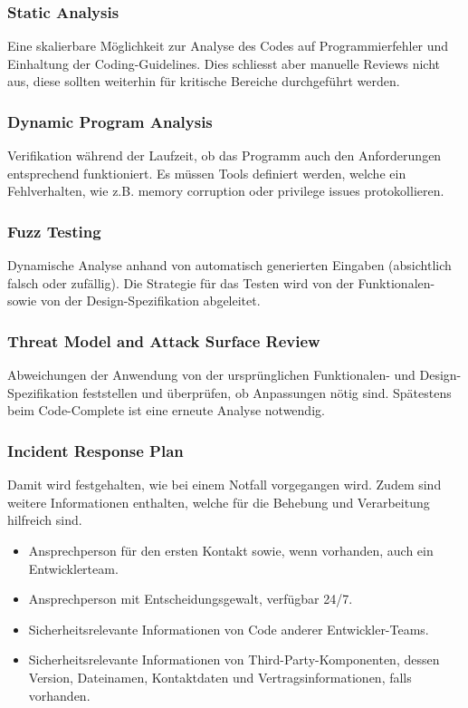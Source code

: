 \subsubsection{Static Analysis}
Eine skalierbare Möglichkeit zur Analyse des Codes auf Programmierfehler und Einhaltung der Coding-Guidelines. Dies schliesst aber manuelle Reviews nicht aus, diese sollten weiterhin für kritische Bereiche durchgeführt werden.

\subsubsection{Dynamic Program Analysis}
Verifikation während der Laufzeit, ob das Programm auch den Anforderungen entsprechend funktioniert. Es müssen Tools definiert werden, welche ein Fehlverhalten, wie z.B. memory corruption oder privilege issues protokollieren.

\subsubsection{Fuzz Testing}
Dynamische Analyse anhand von automatisch generierten Eingaben (absichtlich falsch oder zufällig). Die Strategie für das Testen wird von der Funktionalen- sowie von der Design-Spezifikation abgeleitet.

\subsubsection{Threat Model and Attack Surface Review}
Abweichungen der Anwendung von der ursprünglichen Funktionalen- und Design-Spezifikation feststellen und überprüfen, ob Anpassungen nötig sind. Spätestens beim Code-Complete ist eine erneute Analyse notwendig.

\subsubsection{Incident Response Plan}
Damit wird festgehalten, wie bei einem Notfall vorgegangen wird. Zudem sind weitere Informationen enthalten, welche für die Behebung und Verarbeitung hilfreich sind.
\begin{itemize}
	\item Ansprechperson für den ersten Kontakt sowie, wenn vorhanden, auch ein Entwicklerteam.
	\item Ansprechperson mit Entscheidungsgewalt, verfügbar 24/7.
	\item Sicherheitsrelevante Informationen von Code anderer Entwickler-Teams.
	\item Sicherheitsrelevante Informationen von Third-Party-Komponenten, dessen Version, Dateinamen, Kontaktdaten und Vertragsinformationen, falls vorhanden.
\end{itemize}

